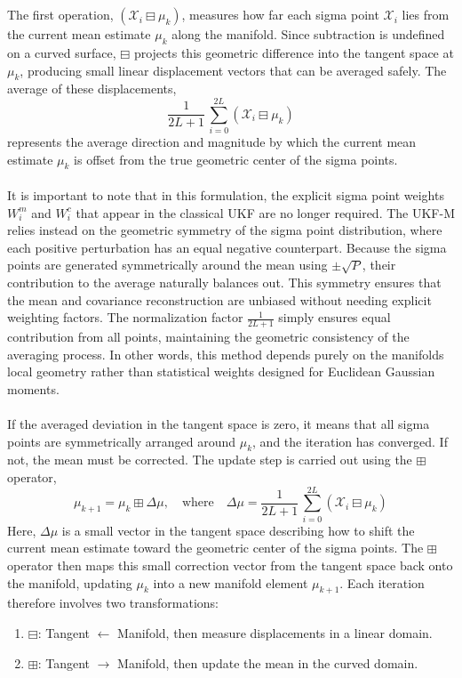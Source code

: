 \\ \\
The first operation, $(\mathcal{X}_i \boxminus \mu_k)$, measures how far each sigma point $\mathcal{X}_i$ lies from the current mean estimate $\mu_k$ along the manifold. Since subtraction is undefined on a curved surface, $\boxminus$ projects this geometric difference into the tangent space at $\mu_k$, producing small linear displacement vectors that can be averaged safely. The average of these displacements,
$$
    \frac{1}{2L + 1} \, \sum_{i=0}^{2L} (\mathcal{X}_i \boxminus \mu_k)
$$
represents the average direction and magnitude by which the current mean estimate $\mu_k$ is offset from the true geometric center of the sigma points.  
\\ \\
It is important to note that in this formulation, the explicit sigma point weights $W_i^m$ and $W_i^c$ that appear in the classical UKF are no longer required. The UKF-M relies instead on the geometric symmetry of the sigma point distribution, where each positive perturbation has an equal negative counterpart. Because the sigma points are generated symmetrically around the mean using $\pm\sqrt{P}$, their contribution to the average naturally balances out. This symmetry ensures that the mean and covariance reconstruction are unbiased without needing explicit weighting factors. The normalization factor $\frac{1}{2L+1}$ simply ensures equal contribution from all points, maintaining the geometric consistency of the averaging process. In other words, this method depends purely on the manifolds local geometry rather than statistical weights designed for Euclidean Gaussian moments.  
\\ \\
If the averaged deviation in the tangent space is zero, it means that all sigma points are symmetrically arranged around $\mu_k$, and the iteration has converged. If not, the mean must be corrected. The update step is carried out using the $\boxplus$ operator,
$$
    \mu_{k+1} = \mu_k \boxplus \Delta\mu,
    \quad \text{where} \quad 
    \Delta\mu = \frac{1}{2L + 1} \, \sum_{i=0}^{2L} (\mathcal{X}_i \boxminus \mu_k)
$$
Here, $\Delta\mu$ is a small vector in the tangent space describing how to shift the current mean estimate toward the geometric center of the sigma points. The $\boxplus$ operator then maps this small correction vector from the tangent space back onto the manifold, updating $\mu_k$ into a new manifold element $\mu_{k+1}$. Each iteration therefore involves two transformations:  
\begin{enumerate}
    \item $\boxminus$: Tangent $\leftarrow$ Manifold, then measure displacements in a linear domain.
    \item $\boxplus$: Tangent $\rightarrow$ Manifold, then update the mean in the curved domain.
\end{enumerate}
